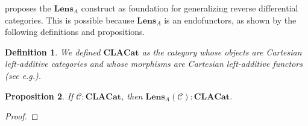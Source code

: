 \documentclass[12pt,a4paper,openright,twoside]{report}
\theoremstyle{plain}
\newtheorem{proposition}{Proposition}
\newtheorem{definition}[proposition]{Definition}
\theoremstyle{definition}
\begin{document}
\cite{gavranovic2024fundamental} proposes the $\mathbf{Lens}_A$ construct as foundation for generalizing reverse differential categories. This is possible because $\mathbf{Lens}_A$ is an endofunctors, as shown by the following definitions and propositions.

\begin{definition}
  We defined $\mathbf{CLACat}$ as the category whose objects are Cartesian left-additive categories and whose morphisms are Cartesian left-additive functors (see e.g.\cite{blute2006differential}).
\end{definition}

\begin{proposition}
  If $\mathcal{C} : \mathbf{CLACat}$, then $\mathbf{Lens}_A(\mathcal{C}) : \mathbf{CLACat}$.
\end{proposition}
\begin{proof}

\end{proof}
\end{document}
